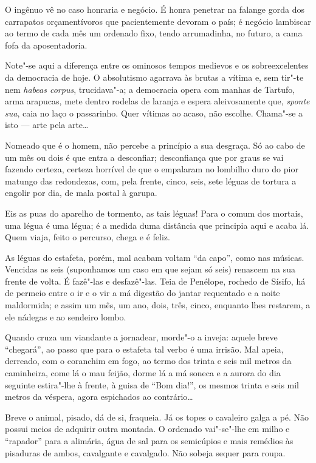 O ingênuo vê no caso honraria e negócio. É honra penetrar na falange
gorda dos carrapatos orçamentívoros que pacientemente devoram o país; é
negócio lambiscar ao termo de cada mês um ordenado fixo, tendo
arrumadinha, no futuro, a cama fofa da aposentadoria.

Note"-se aqui a diferença entre os ominosos tempos medievos e os
sobreexcelentes da democracia de hoje. O absolutismo agarrava às brutas
a vítima e, sem tir"-te nem \emph{habeas corpus}, trucidava"-a; a
democracia opera com manhas de Tartufo, arma arapucas, mete dentro
rodelas de laranja e espera aleivosamente que, \emph{sponte sua}, caia
no laço o passarinho. Quer vítimas ao acaso, não escolhe. Chama"-se a
isto --- arte pela arte\ldots{}

Nomeado que é o homem, não percebe a princípio a sua desgraça. Só ao
cabo de um mês ou dois é que entra a desconfiar; desconfiança que por
graus se vai fazendo certeza, certeza horrível de que o empalaram no
lombilho duro do pior matungo das redondezas, com, pela frente, cinco,
seis, sete léguas de tortura a engolir por dia, de mala postal à garupa.

Eis as puas do aparelho de tormento, as tais léguas! Para o comum dos
mortais, uma légua é uma légua; é a medida duma distância que principia
aqui e acaba lá. Quem viaja, feito o percurso, chega e é feliz.

As léguas do estafeta, porém, mal acabam voltam ``da capo'', como nas
músicas. Vencidas as seis (suponhamos um caso em que sejam só seis)
renascem na sua frente de volta. É fazê"-las e desfazê"-las. Teia de
Penélope, rochedo de Sísifo, há de permeio entre o ir e o vir a má
digestão do jantar requentado e a noite maldormida; e assim um mês, um
ano, dois, três, cinco, enquanto lhes restarem, a ele nádegas e ao
sendeiro lombo.

Quando cruza um viandante a jornadear, morde"-o a inveja: aquele breve
``chegará'', ao passo que para o estafeta tal verbo é uma irrisão. Mal
apeia, derreado, com o coranchim em fogo, ao termo dos trinta e seis mil
metros da caminheira, come lá o mau feijão, dorme lá a má soneca e a
aurora do dia seguinte estira"-lhe à frente, à guisa de ``Bom dia!'', os
mesmos trinta e seis mil metros da véspera, agora espichados ao
contrário\ldots{}

Breve o animal, pisado, dá de si, fraqueia. Já os topes o cavaleiro
galga a pé. Não possui meios de adquirir outra montada. O ordenado
vai"-se"-lhe em milho e ``rapador'' para a alimária, água de sal para os
semicúpios e mais remédios às pisaduras de ambos, cavalgante e
cavalgado. Não sobeja sequer para roupa.

